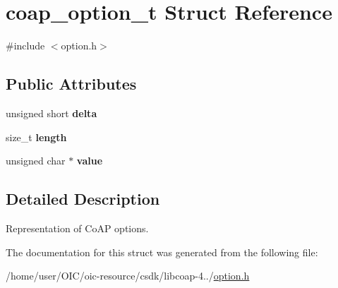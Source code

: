 \hypertarget{structcoap__option__t}{}\section{coap\+\_\+option\+\_\+t Struct Reference}
\label{structcoap__option__t}


{\ttfamily \#include $<$option.\+h$>$}

\subsection*{Public Attributes}
\begin{DoxyCompactItemize}
\item 
\hypertarget{structcoap__option__t_aeb85e4138f6814420599305cf07be18b}{}unsigned short {\bfseries delta}\label{structcoap__option__t_aeb85e4138f6814420599305cf07be18b}

\item 
\hypertarget{structcoap__option__t_af0e531c8722b480d4ca317b1679a954f}{}size\+\_\+t {\bfseries length}\label{structcoap__option__t_af0e531c8722b480d4ca317b1679a954f}

\item 
\hypertarget{structcoap__option__t_aa50001a75531923991a0b0328a1f5e80}{}unsigned char $\ast$ {\bfseries value}\label{structcoap__option__t_aa50001a75531923991a0b0328a1f5e80}

\end{DoxyCompactItemize}


\subsection{Detailed Description}
Representation of Co\+A\+P options. 

The documentation for this struct was generated from the following file\+:\begin{DoxyCompactItemize}
\item 
/home/user/\+O\+I\+C/oic-\/resource/csdk/libcoap-\/4../\hyperlink{option_8h}{option.\+h}\end{DoxyCompactItemize}
